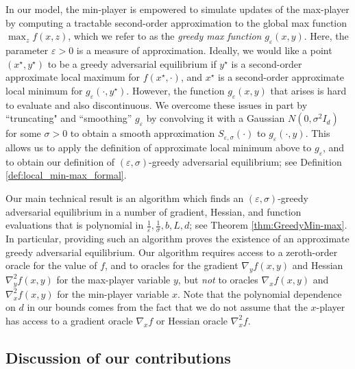 \documentclass[11pt,letterpaper]{article}
\renewcommand{\epsilon}{\varepsilon}
\newcommand{\eps}{\varepsilon}
\begin{document}
In our model, the min-player is empowered to simulate updates of the max-player by computing a tractable second-order approximation to the global max function $\max_z f(x, z)$, which we refer to as the {\em greedy max function} $g_\epsilon(x,y)$. 
%
Here, the parameter $\eps>0$ is a measure of approximation.
%
Ideally, we would like a point $(x^\star, y^\star)$ to be a greedy adversarial equilibrium if $y^\star$ is a second-order approximate local maximum for $f(x^\star, \cdot)$, and $x^\star$ is a second-order approximate local  minimum for  $g_\epsilon(\cdot, y^\star)$.
 However, the function $g_\epsilon(x, y)$ that arises is hard to evaluate and also discontinuous.
  We overcome these issues in part by ``truncating" and ``smoothing'' $g_\epsilon$ by convolving it with a Gaussian $N(0, \sigma^2 I_d)$ for some $\sigma>0$ to obtain a smooth approximation $S_{\epsilon, \sigma}(\cdot)$ to $g_\epsilon(\cdot, y)$.  
  This allows us to apply the definition of approximate local minimum above to $g_\epsilon$, and to obtain our definition of $(\eps,\sigma)$-greedy adversarial equilibrium; see  Definition \ref{def:local_min-max_formal}.

Our main technical result is an algorithm which finds an $(\epsilon, \sigma)$-greedy adversarial equilibrium in a number of gradient, Hessian, and function evaluations that is polynomial in $\frac{1}{\epsilon}, \frac{1}{\sigma}, b, L, d$; see Theorem \ref{thm:GreedyMin-max}.
%
In particular, providing such an algorithm proves the existence of an approximate greedy adversarial equilibrium.
%
Our algorithm requires access to a zeroth-order oracle for the value of $f$, and to oracles for the gradient $\nabla_y f(x,y)$ and Hessian $\nabla_y^2 f(x,y)$ for the max-player variable $y$, but {\em not} to oracles $\nabla_ x f(x,y)$ and $\nabla_x^2 f(x,y)$ for the min-player variable $x$.  
%
Note that the polynomial dependence on $d$ in our bounds comes from the fact that we do not assume that the $x$-player has access to a gradient oracle $\nabla_x f$ or Hessian oracle $\nabla^2_x f$.
%


\subsection{Discussion of our contributions}


\vspace{-2mm}
\end{document}
